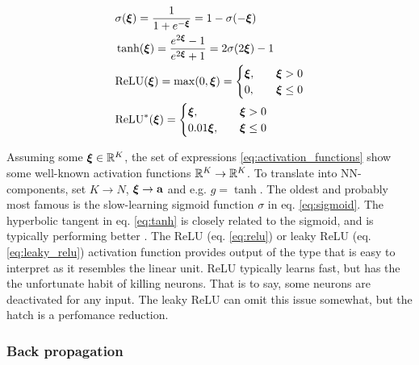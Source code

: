     \begin{subequations}\label{eq:activation_functions}
        \begin{align}
            &\sigma(\svec{\xi}) = \frac{1}{1+e^{-\svec{\xi}}} = 1- \sigma(-\svec{\xi})\label{eq:sigmoid}\\
            &\tanh(\svec{\xi}) = \frac{e^{2\svec{\xi}}-1}{e^{2\svec{\xi}}+1} = 2\sigma(2\svec{\xi}) -1\label{eq:tanh} \\
            &\mathrm{ReLU}(\svec{\xi}) = \max(0,\svec{\xi}) = \begin{cases}
                \svec{\xi},\quad &\svec{\xi} >0 \\
                0,\quad &\svec{\xi} \leq 0
            \end{cases} \label{eq:relu}\\
            &\mathrm{ReLU}^*(\svec{\xi})  = \begin{cases}
                \svec{\xi},\quad &\svec{\xi} >0 \\
                0.01\svec{\xi},\quad &\svec{\xi} \leq 0
            \end{cases} \label{eq:leaky_relu}
        \end{align}
    \end{subequations}

    Assuming some $\svec{\xi} \in \RR[K]$, the set of expressions \eqref{eq:activation_functions} show some well-known activation functions $\RR[K] \to \RR[K]$. To translate into NN-components, set $K\to N$, $\svec{\xi} \to \vec{a}$ and e.g. $g = \tanh$. 
    The oldest and probably most famous is the slow-learning sigmoid function $\sigma$ in eq. \eqref{eq:sigmoid}. The hyperbolic tangent in eq. \eqref{eq:tanh} is closely related to the sigmoid, and is typically performing better \citep{Goodfellow2016}. The ReLU (eq. \eqref{eq:relu}) or leaky ReLU (eq. \eqref{eq:leaky_relu}) activation function provides output of the type that is easy to interpret as it resembles the linear unit. ReLU typically learns fast, but has the the unfortunate habit of killing neurons. That is to say, some neurons are deactivated for any input. The leaky ReLU can omit this issue somewhat, but the hatch is a perfomance reduction.

    





    \subsubsection{Back propagation}\label{sec:back_propagation}


